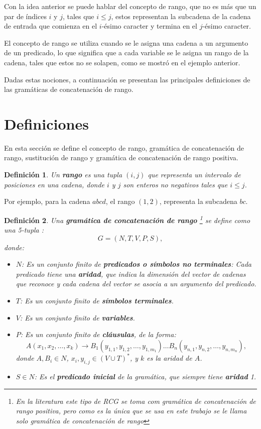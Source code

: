 \documentclass[12pt]{article}
\newtheorem{definition}{Definición}
\begin{document}
Con la idea anterior se puede hablar del concepto de rango, que no es más que un par de índices $i$ y $j$, tales que $i\leq j$, estos
representan la subcadena de la cadena de entrada que comienza en el $i$-ésimo caracter y termina en el $j$-ésimo caracter.

El concepto de rango se utiliza cuando se le asigna una cadena a un argumento de un predicado, lo que significa que a cada variable se le asigna un rango de la cadena, tales que estos no se solapen, como se mostró en el ejemplo anterior.

Dadas estas nociones, a continuación se presentan las principales definiciones de las gramáticas de concatenación de rango.

\section{Definiciones}

En esta sección se define el concepto de rango, gramática de concatenación de rango, sustitución de rango y gramática de concatenación de rango positiva.

\begin{definition}
    Un \textbf{rango} es una tupla $(i, j)$ que representa un intervalo de posiciones en una cadena, donde $i$ y $j$ son enteros no negativos tales que $i \leq j$.    
\end{definition}

Por ejemplo, para la cadena $abcd$, el rango $(1,2)$, representa la subcadena $bc$.

\begin{definition}
    Una \textbf{gramática de concatenación de rango} \footnote{En la literatura este tipo de RCG se toma com gramática de concatenación de rango positiva, pero como es la única que
        se usa en este trabajo se le llama solo gramática de concatenación de rango} se define como una 5-tupla
    :
    \[
        G = (N, T, V, P, S),
    \]
    donde:
    
    \begin{itemize}
        \item $N$: Es un conjunto finito de \textbf{predicados o símbolos no terminales}: Cada predicado tiene una \textbf{aridad}, que indica la dimensión del vector de cadenas que reconoce y cada cadena del vector se asocia a un argumento del predicado.
        \item $T$: Es un conjunto finito de \textbf{símbolos terminales}.
        \item $V$: Es un conjunto finito de \textbf{variables}.
        \item $P$: Es un conjunto finito de \textbf{cláusulas}, de la forma:
              \[
                  A(x_1, x_2, \ldots, x_k) \to B_1(y_{1,1}, y_{1,2}, \ldots, y_{1,m_1}) \ldots B_n(y_{n,1}, y_{n,2}, \ldots, y_{n,m_n}),
              \]
              donde $A, B_i \in N$, $x_i, y_{i,j} \in (V \cup T)^*$, y $k$ es la aridad de $A$.
        \item $S \in N$: Es el \textbf{predicado inicial} de la gramática, que siempre tiene \textbf{aridad} 1.
    \end{itemize}
\end{definition}
\end{document}
